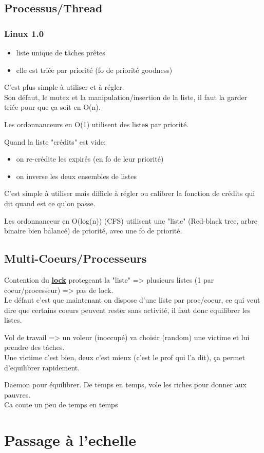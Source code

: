 \documentclass[11pt]{article}
\begin{document}
\subsection{Processus/Thread}
\subsubsection{Linux 1.0}
\begin{itemize}
    \item liste unique de tâches prêtes
    \item elle est triée par priorité (fo de priorité goodness)
\end{itemize}

C'est plus simple à utiliser et à régler.\\
Son défaut, le mutex et la manipulation/insertion de la liste, il faut la garder triée pour que ça soit en O(n).

Les ordonnanceurs en O(1) utilisent des liste\textbf{s} par priorité.\\
\begin{figure}
    \centering
\end{figure}
Quand la liste "crédits" est vide:
\begin{itemize}
    \item on re-crédite les expirés (en fo de leur priorité)
    \item on inverse les deux ensembles de listes
\end{itemize}
C'est simple à utiliser mais difficle à régler ou calibrer la fonction de crédits qui dit quand est ce qu'on passe.

Les ordonnanceur en O(log(n)) (CFS) utilisent une "liste" (Red-black tree, arbre binaire bien balancé) de priorité, avec une fo de priorité.

\subsection{Multi-Coeurs/Processeurs}
Contention du \underline{\textbf{lock}} protegeant la "liste" => plusieurs listes (1 par coeur/processeur) => pas de lock.\\
Le défaut c'est que maintenant on dispose d'une liste par proc/coeur, ce qui veut dire que certains coeurs peuvent rester sans activité, il faut donc equilibrer les listes.

Vol de travail => un voleur (inoccupé) va choisir (random) une victime et lui prendre des tâches.\\
Une victime c'est bien, deux c'est mieux (c'est le prof qui l'a dit), ça permet d'equilibrer rapidement.


Daemon pour équilibrer. De temps en temps, vole les riches pour donner aux pauvres.\\
Ca coute un peu de temps en temps


\section{Passage à l'echelle}
\end{document}
